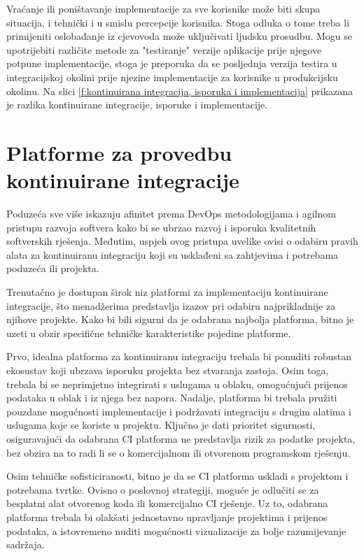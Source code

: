 \documentclass[a4paper,12pt,oneside]{article}
\begin{document}
Vraćanje ili poništavanje implementacije za sve korisnike može biti skupa situacija, i tehnički i u smislu percepcije korisnika. Stoga odluka o tome treba li primijeniti oslobađanje iz cjevovoda može uključivati ljudsku prosudbu. Mogu se upotrijebiti različite metode za "testiranje" verzije aplikacije prije njegove potpune implementacije, stoga je preporuka da se posljednja verzija testira u integracijskoj okolini prije njezine implementacije za korisnike u produkcijsku okolinu.\cite{brent-2020-CI/CD} Na slici \ref{f:kontinuirana integracija, isporuka i implementacija} prikazana je razlika kontinuirane integracije, isporuke i implementacije.

\newpage

\section{Platforme za provedbu kontinuirane integracije}

 Poduzeća sve više iskazuju afinitet prema DevOps metodologijama i agilnom pristupu razvoja softvera kako bi se ubrzao razvoj i isporuka kvalitetnih softverskih rješenja. Međutim, uspjeh ovog pristupa uvelike ovisi o odabiru pravih alata za kontinuiranu integraciju koji su usklađeni sa zahtjevima i potrebama poduzeća ili projekta.

Trenutačno je dostupan širok niz platformi za implementaciju kontinuirane integracije, što menadžerima predstavlja izazov pri odabiru najprikladnije za njihove projekte. Kako bi bili sigurni da je odabrana najbolja platforma, bitno je uzeti u obzir specifične tehničke karakteristike pojedine platforme.

Prvo, idealna platforma za kontinuiranu integraciju trebala bi ponuditi robustan ekosustav koji ubrzava isporuku projekta bez stvaranja zastoja. Osim toga, trebala bi se neprimjetno integrirati s uslugama u oblaku, omogućujući prijenos podataka u oblak i iz njega bez napora. Nadalje, platforma bi trebala pružiti pouzdane mogućnosti implementacije i podržavati integraciju s drugim alatima i uslugama koje se koriste u projektu. Ključno je dati prioritet sigurnosti, osiguravajući da odabrana CI platforma ne predstavlja rizik za podatke projekta, bez obzira na to radi li se o komercijalnom ili otvorenom programskom rješenju.

Osim tehničke sofisticiranosti, bitno je da se CI platforma uskladi s projektom i potrebama tvrtke. Ovisno o poslovnoj strategiji, moguće je odlučiti se za besplatni alat otvorenog koda ili komercijalno CI rješenje. Uz to, odabrana platforma trebala bi olakšati jednostavno upravljanje projektima i prijenos podataka, a istovremeno nuditi mogućnosti vizualizacije za bolje razumijevanje sadržaja.
\end{document}
